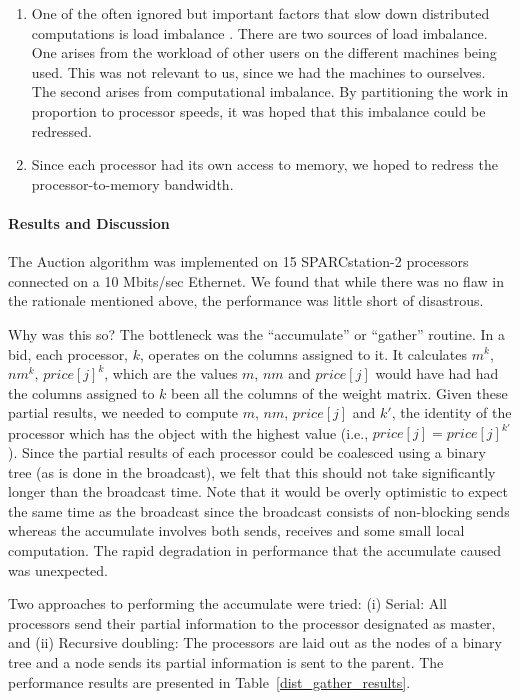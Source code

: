 \begin{enumerate}
\item One of the often ignored but important
factors that slow down distributed computations is load imbalance \cite{sun92}.
There are two sources of load imbalance. One arises from
the workload of other users on the different machines being used. 
This was not relevant to us, since we had the machines to ourselves.  
The second arises from computational
imbalance. By partitioning the work in proportion to processor speeds,
it was hoped that this imbalance could be redressed.

\item Since each processor had its own access to memory, we hoped
to redress the processor-to-memory bandwidth.

\end{enumerate}

\paragraph{Results and Discussion}
The Auction algorithm was implemented on 15 SPARCstation-2 processors
connected on a 10 Mbits/sec Ethernet. We found that 
while there was no flaw in the rationale mentioned above,
the performance was little short of disastrous. 

Why was this so? The bottleneck was the ``accumulate'' 
or ``gather'' routine. In a bid, 
each processor, $k$, operates on the columns assigned to it.
It calculates ${m}^k$, ${{nm}}^k$, ${price[j]}^k$, which are the values
$m$, ${nm}$ and $price[j]$ would have had had the
columns assigned to $k$ been all the columns of the weight matrix.
Given these partial results, we needed to compute 
$m$, $nm$, $price[j]$ and $k'$, the identity of the processor
which has the object with the highest value 
(i.e., $price[j] = {price[j]}^{k'}$).
Since the partial results of each processor could be coalesced
using a binary tree (as is done in the broadcast), we felt
that this should not take significantly longer than the
broadcast time. Note that it would be overly optimistic to expect
the same time as the broadcast since the broadcast consists of 
non-blocking sends whereas the accumulate involves both sends,
receives and some small local computation. 
The rapid degradation in performance that the accumulate caused 
was unexpected. 

Two approaches to performing the accumulate were tried: 
(i) Serial: All processors send their partial information to
the processor designated as master, and
(ii) Recursive doubling:  The processors are laid out as the nodes of 
a binary tree and a node sends its partial information is sent to the parent.
The performance results are presented in Table~\ref{dist_gather_results}.

